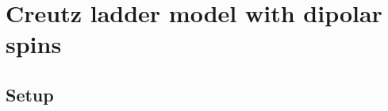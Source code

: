 \chapter{Creutz ladder model with dipolar spins}
\label{creutz_ladder}


\newcommand{\et}{\operatorname{\eta}}
\newcommand{\tbar}{\bar{t}}


\newcommand{\orbital}[2]{TODO}
\newcommand{\op}{\orbital{plus}{+}}
\newcommand{\om}{\orbital{minus}{-}}

\newcommand{\ladderKet}[3]{TODO}
\newcommand{\upp}{\ladderKet{0.7ex}{+}{plus}}
\newcommand{\dnp}{\ladderKet{-0.7ex}{+}{plus}}
\newcommand{\upm}{\ladderKet{0.7ex}{-}{minus}}
\newcommand{\dnm}{\ladderKet{-0.7ex}{-}{minus}}

\section{Setup}






